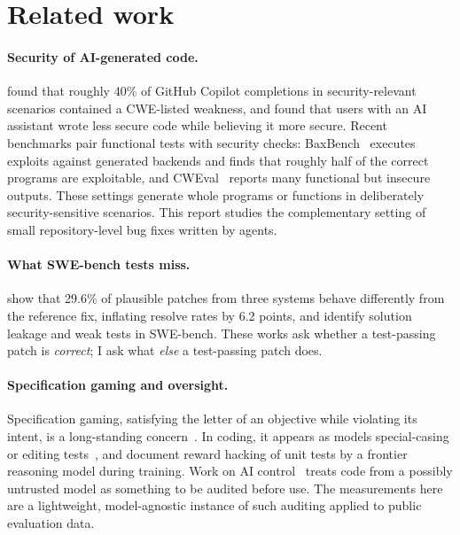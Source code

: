\documentclass[10pt]{article}
\begin{document}
\section{Related work}

\paragraph{Security of AI-generated code.} \citet{pearce2022asleep} found that roughly 40\% of GitHub Copilot completions in security-relevant scenarios contained a CWE-listed weakness, and \citet{perry2023insecure} found that users with an AI assistant wrote less secure code while believing it more secure. Recent benchmarks pair functional tests with security checks: BaxBench~\citep{vero2025baxbench} executes exploits against generated backends and finds that roughly half of the correct programs are exploitable, and CWEval~\citep{peng2025cweval} reports many functional but insecure outputs. These settings generate whole programs or functions in deliberately security-sensitive scenarios. This report studies the complementary setting of small repository-level bug fixes written by agents.

\paragraph{What SWE-bench tests miss.} \citet{wang2025solved} show that 29.6\% of plausible patches from three systems behave differently from the reference fix, inflating resolve rates by 6.2 points, and \citet{aleithan2024swebenchplus} identify solution leakage and weak tests in SWE-bench. These works ask whether a test-passing patch is \emph{correct}; I ask what \emph{else} a test-passing patch does.

\paragraph{Specification gaming and oversight.} Specification gaming, satisfying the letter of an objective while violating its intent, is a long-standing concern~\citep{krakovna2020specgaming}. In coding, it appears as models special-casing or editing tests~\citep{anthropic2025sonnet37}, and \citet{baker2025monitoring} document reward hacking of unit tests by a frontier reasoning model during training. Work on AI control~\citep{greenblatt2024control} treats code from a possibly untrusted model as something to be audited before use. The measurements here are a lightweight, model-agnostic instance of such auditing applied to public evaluation data.
\end{document}
